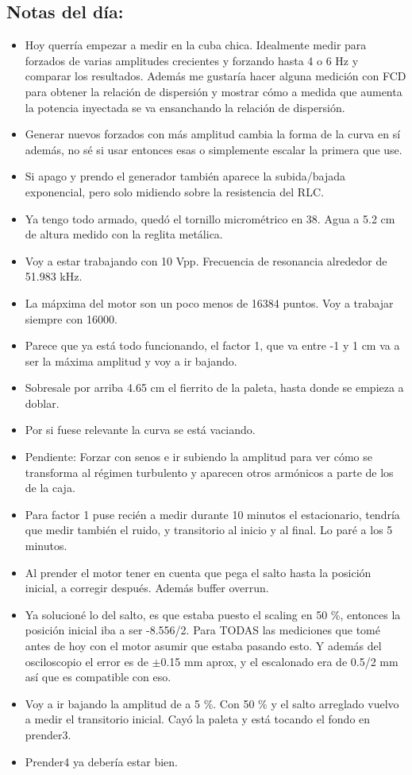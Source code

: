 \subsection*{Notas del día:}
\begin{itemize} 
	\setlength\itemsep{0.1em}
	\item Hoy querría empezar a medir en la cuba chica. Idealmente medir para forzados de varias amplitudes crecientes y forzando hasta 4 o 6 Hz y comparar los resultados. Además me gustaría hacer alguna medición con FCD para obtener la relación de dispersión y mostrar cómo a medida que aumenta la potencia inyectada se va ensanchando la relación de dispersión. 
	\item  Generar nuevos forzados con más amplitud cambia la forma de la curva en sí además, no sé si usar entonces esas o simplemente escalar la primera que use. 
	
	\item  Si apago y prendo el generador también aparece la subida/bajada exponencial, pero solo midiendo sobre la resistencia del RLC.  
	
	\item  Ya tengo todo armado, quedó el tornillo micrométrico en 38. Agua a 5.2 cm de altura medido con la reglita metálica.  
	\item  Voy a estar trabajando con 10 Vpp. Frecuencia de resonancia alrededor de 51.983 kHz. 
	\item  La mápxima del motor son un poco menos de 16384 puntos. Voy a trabajar siempre con 16000. 
	\item  Parece que ya está todo funcionando, el factor 1, que va entre -1 y 1 cm va a ser la máxima amplitud y voy a ir bajando. 
	\item  Sobresale por arriba 4.65 cm el fierrito de la paleta, hasta donde se empieza a doblar. 
	\item  Por si fuese relevante la curva se está vaciando. 
	
	\item  Pendiente: Forzar con senos e ir subiendo la amplitud para ver cómo se transforma al régimen turbulento y aparecen otros armónicos a parte de los de la caja. 
	
	\item  Para factor 1 puse recién a medir durante 10 minutos el estacionario, tendría que medir también el ruido, y transitorio al inicio y al final. Lo paré a los 5 minutos. 
	\item  Al prender el motor tener en cuenta que pega el salto hasta la posición inicial, a corregir después. Además buffer overrun. 
	\item Ya solucioné lo del salto, es que estaba puesto el scaling en 50 \%, entonces la posición inicial iba a ser -8.556/2. Para TODAS las mediciones que tomé antes de hoy con el motor asumir que estaba pasando esto. Y además del osciloscopio el error es de $\pm$0.15 mm aprox, y el escalonado era de 0.5/2 mm así que es compatible con eso. 
	\item Voy a ir bajando la amplitud de a 5 \%. Con 50 \% y el salto arreglado vuelvo a medir el transitorio inicial. Cayó la paleta y está tocando el fondo en prender3. 
	\item Prender4 ya debería estar bien.   
	

\end{itemize}
